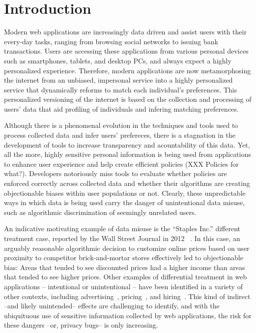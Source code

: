 
\section{Introduction}

Modern web applications are increasingly data driven and assist users
with their every-day tasks, ranging from browsing social networks to
issuing bank transactions. Users are accessing these applications from
various personal devices such as smartphones, tablets, and desktop PCs,
and always expect a highly personalized experience. Therefore, modern
applications are now metamorphosing the internet from an unbiased, impersonal
service into a highly personalized service that dynamically reforms to match
each individual's preferences. This personalized versioning of the internet
is based on the collection and processing of users' data that aid profiling
of individuals and infering matching preferences.

Although there is a phenomenal evolution in the techniques and tools used to
process collected data and infer users' prefereces, there is a stagnation
in the development of tools to increase transparency and acountability of
this data. Yet, all the more,  highly sensitive personal information is being
used from applications to enhance user experience and help create efficient
policies (XXX Policies for what?).
Developers notoriously miss tools to evaluate whether policies are
enforced correctly across collected data and whether their algorithms are
creating objectionable biases within user populations or not. Clearly,
these unpredictable ways in which data is being used carry the danger of
unintentional data misuse, such as algorithmic discrimination of seemingly
unrelated users.

An indicative motivating example of data misuse is the ``Staples Inc.''
different treatment case, reported by the Wall Street Journal in 2012
~\cite{Staples}. In this case, an arguably reasonable algorithmic decision
to customize online prices based on user proximity to competitor
brick-and-mortar stores effectively led to objectionable bias:
Areas that tended to see discounted prices had a higher income than areas
that tended to see higher prices. Other examples of differential treatment in
web applications – intentional or unintentional – have been identified in a
variety of other contexts, including advertising~\cite{Sweeney:AdDiscrimination},
pricing~\cite{Hannak:PriceDiscrimination}, and
hiring~\cite{acquisiti:HiringDiscrimination}. This kind of indirect --and likely
unintended-- effects are challenging to identify, and with the ubiquituous use
of sensitive information collected by web applications, the risk for these
dangers --or, privacy bugs-- is only increasing.

